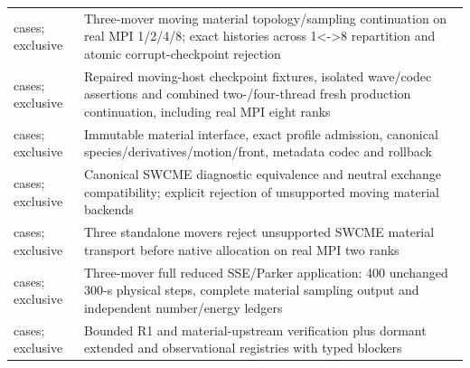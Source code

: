 \begin{longtable}{L{0.38\textwidth}L{0.51\textwidth}}
 cases; exclusive & Three-mover moving material topology/sampling continuation on real MPI 1/2/4/8; exact histories across 1<->8 repartition and atomic corrupt-checkpoint rejection\newline{}\\
 cases; exclusive & Repaired moving-host checkpoint fixtures, isolated wave/codec assertions and combined two-/four-thread fresh production continuation, including real MPI eight ranks\newline{}\\
 cases; exclusive & Immutable material interface, exact profile admission, canonical species/derivatives/motion/front, metadata codec and rollback\newline{}\\
 cases; exclusive & Canonical SWCME diagnostic equivalence and neutral exchange compatibility; explicit rejection of unsupported moving material backends\newline{}\\
 cases; exclusive & Three standalone movers reject unsupported SWCME material transport before native allocation on real MPI two ranks\newline{}\\
 cases; exclusive & Three-mover full reduced SSE/Parker application: 400 unchanged 300-s physical steps, complete material sampling output and independent number/energy ledgers\newline{}\\
 cases; exclusive & Bounded R1 and material-upstream verification plus dormant extended and observational registries with typed blockers\newline{}\\

\end{longtable}
